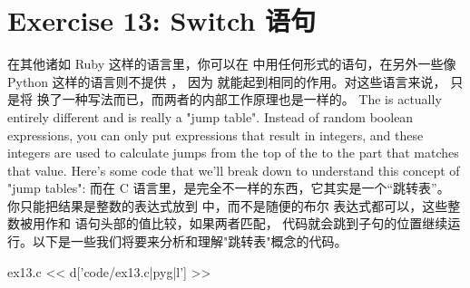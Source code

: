 \chapter{Exercise 13: Switch 语句}

在其他诸如 Ruby 这样的语言里，你可以在 
中用任何形式的语句，在另外一些像 Python 这样的语言则不提供 ，
因为 就能起到相同的作用。对这些语言来说， 只是将 
换了一种写法而已，而两者的内部工作原理也是一样的。
The  is actually entirely different and is really a "jump
table".  Instead of random boolean expressions, you can only put expressions
that result in integers, and these integers are used to calculate jumps from
the top of the  to the part that matches that value.  Here's some
code that we'll break down to understand this concept of "jump tables":
而在 C 语言里，是完全不一样的东西，它其实是一个“跳转表”。
你只能把结果是整数的表达式放到 中，而不是随便的布尔 
表达式都可以，这些整数被用作和  语句头部的值比较，如果两者匹配，
代码就会跳到子句的位置继续运行。以下是一些我们将要来分析和理解"跳转表"概念的代码。

\begin{code}{ex13.c}
<< d['code/ex13.c|pyg|l'] >>
\end{code}


